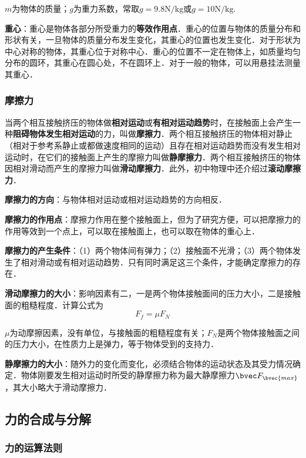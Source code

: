 $m$为物体的质量；$g$为重力系数，常取$g=9.8\mathrm{N/kg}$或$g=\mathrm{10N/kg}$.

\textbf{重心}：重心是物体各部分所受重力的\textbf{等效作用点}．重心的位置与物体的质量分布和形状有关，一旦物体的质量分布发生变化，其重心的位置也发生变化．对于形状为中心对称的物体，其重心位于对称中心．重心的位置不一定在物体上，如质量均匀分布的圆环，其重心在圆心处，不在圆环上．对于一般的物体，可以用悬挂法测量其重心．


\subsubsection{摩擦力}
当两个相互接触挤压的物体做\textbf{相对运动}或\textbf{有相对运动趋势}时，在接触面上会产生一种\textbf{阻碍物体发生相对运动}的力，叫做\textbf{摩擦力}．两个相互接触挤压的物体相对静止（相对于参考系静止或都做速度相同的运动）且存在相对运动趋势而没有发生相对运动时，在它们的接触面上产生的摩擦力叫做\textbf{静摩擦力}．两个相互接触挤压的物体因相对滑动而产生的摩擦力叫做\textbf{滑动摩擦力}．此外，初中物理中还介绍过\textbf{滚动摩擦力}．

\textbf{摩擦力的方向}：与物体相对运动或相对运动趋势的方向相反．

\textbf{摩擦力的作用点}：摩擦力作用在整个接触面上，但为了研究方便，可以把摩擦力的作用等效到一个点上，可以取在接触面上，也可以取在物体的重心上．

\textbf{摩擦力的产生条件}：（1）两个物体间有弹力；（2）接触面不光滑；（3）两个物体发生了相对滑动或有相对运动趋势．只有同时满足这三个条件，才能确定摩擦力的存在．

\textbf{滑动摩擦力的大小}：影响因素有二，一是两个物体接触面间的压力大小，二是接触面的粗糙程度．计算公式为
\begin{equation}
F_f=\mu F_N
\end{equation}

$\mu$为动摩擦因素，没有单位，与接触面的粗糙程度有关；$F_N$是两个物体接触面之间的压力大小，在性质力上是弹力，等于物体受到的支持力．

\textbf{静摩擦力的大小}：随外力的变化而变化，必须结合物体的运动状态及其受力情况确定．物体刚要发生相对运动时所受的静摩擦力称为最大静摩擦力$\bvec F_\bvec{max}$，其大小略大于滑动摩擦力．

\subsection{力的合成与分解}
\subsubsection{力的运算法则}

